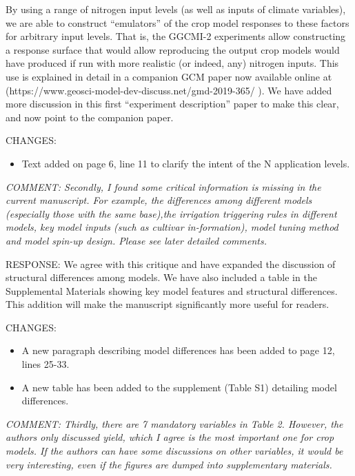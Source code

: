 \documentclass[gmd, manuscript]{copernicus} %
\begin{document}
By using a range of nitrogen input levels (as well as inputs of climate variables), we are able to construct “emulators” of the crop model responses to these factors for arbitrary input levels. That is, the GGCMI-2 experiments allow constructing a response surface that would allow reproducing the output crop models would have produced  if run with more realistic (or indeed, any) nitrogen inputs. This use is explained in detail in a companion GCM paper now available online at (https://www.geosci-model-dev-discuss.net/gmd-2019-365/ ). We have added more discussion in this first “experiment description” paper to make this clear, and now point to the companion paper.
\smallskip

CHANGES:
\begin{itemize}
    \item Text added on page 6, line 11 to clarify the intent of the N application levels.
\end{itemize}

\smallskip

\textcolor{dark-gray}{\textit{COMMENT: Secondly, I found some critical information is missing in the current manuscript. For example, the differences among different models (especially those with the same base),the irrigation triggering rules in different models, key model inputs (such as cultivar in-formation), model tuning method and model spin-up design. Please see later detailed comments. }}

RESPONSE: We agree with this critique and have expanded the discussion of structural differences among models. We have also included a table in the Supplemental Materials showing key model features and structural differences. This addition will make the manuscript significantly more useful for readers.
\smallskip

CHANGES:
\begin{itemize}
    \item A new paragraph describing model differences has been added to page 12, lines 25-33.
    \item A new table has been added to the supplement (Table S1) detailing model differences.
\end{itemize}

\smallskip

\textcolor{dark-gray}{\textit{COMMENT: Thirdly, there are 7 mandatory variables in Table 2. However, the authors only discussed yield, which I agree is the most important one for crop models. If the authors can have some discussions on other variables, it would be very interesting, even if the figures are dumped into supplementary materials.}} 
\end{document}
